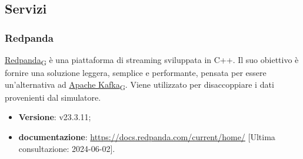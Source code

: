 \subsection{Servizi}
\subsubsection{Redpanda}
\href{https://7last.github.io/docs/pb/documentazione-interna/glossario\#redpanda}{Redpanda\textsubscript{G}} è una piattaforma di streaming sviluppata in C++. Il suo obiettivo è fornire una soluzione leggera, semplice e performante, pensata per essere un'alternativa ad \href{https://7last.github.io/docs/pb/documentazione-interna/glossario\#apache-kafka}{Apache Kafka\textsubscript{G}}. Viene utilizzato per disaccoppiare i dati provenienti dal simulatore.

\begin{itemize}
	\item \textbf{Versione}: v23.3.11;
	\item \textbf{documentazione}: \url{https://docs.redpanda.com/current/home/} [Ultima consultazione: 2024-06-02].
\end{itemize}

